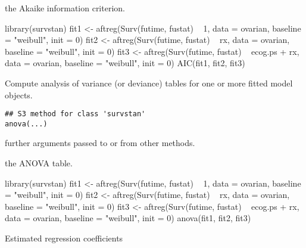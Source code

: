 \documentclass[letterpaper]{book}
\begin{document}
%
\begin{Value}
the Akaike information criterion.
\end{Value}
%
\begin{Examples}
\begin{ExampleCode}

library(survstan)
fit1 <- aftreg(Surv(futime, fustat) ~ 1, data = ovarian, baseline = "weibull", init = 0)
fit2 <- aftreg(Surv(futime, fustat) ~ rx, data = ovarian, baseline = "weibull", init = 0)
fit3 <- aftreg(Surv(futime, fustat) ~ ecog.ps + rx, data = ovarian, baseline = "weibull", init = 0)
AIC(fit1, fit2, fit3)


\end{ExampleCode}
\end{Examples}
%
\begin{Description}\relax
Compute analysis of variance (or deviance) tables for one or more fitted model objects.
\end{Description}
%
\begin{Usage}
\begin{verbatim}
## S3 method for class 'survstan'
anova(...)
\end{verbatim}
\end{Usage}
%
\begin{Arguments}
\begin{ldescription}
\item[\code{...}] further arguments passed to or from other methods.
\end{ldescription}
\end{Arguments}
%
\begin{Value}
the ANOVA table.
\end{Value}
%
\begin{Examples}
\begin{ExampleCode}

library(survstan)
fit1 <- aftreg(Surv(futime, fustat) ~ 1, data = ovarian, baseline = "weibull", init = 0)
fit2 <- aftreg(Surv(futime, fustat) ~ rx, data = ovarian, baseline = "weibull", init = 0)
fit3 <- aftreg(Surv(futime, fustat) ~ ecog.ps + rx, data = ovarian, baseline = "weibull", init = 0)
anova(fit1, fit2, fit3)


\end{ExampleCode}
\end{Examples}
%
\begin{Description}\relax
Estimated regression coefficients
\end{Description}
\end{document}
